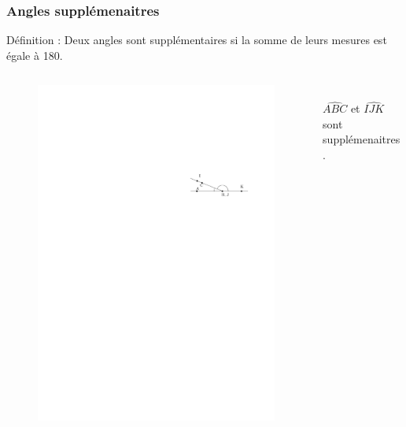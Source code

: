 \documentclass{beamer}
\begin{document}
\begin{frame}
  \frametitle{Angles supplémenaitres}
  \begin{alertblock}{Définition :}	
    Deux angles sont supplémentaires si la somme de leurs mesures est égale à 180.
  \end{alertblock}
  \begin{columns}[t]
    \begin{column}{5cm}
      \begin{figure}[H]
        \centering
        \includegraphics[width=\linewidth]{5x10-angles/sources/supplementaires.pdf}
      \end{figure}
    \end{column}
    \begin{column}{5cm}
      \vspace{1cm}\\
      $\widehat{ABC}$ et $\widehat{IJK}$ sont supplémenaitres.  
    \end{column}
  \end{columns}    
\end{frame}
\end{document}
